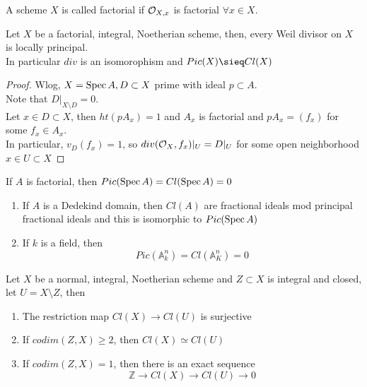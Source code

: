 \documentclass[../main.tex]{subfiles}
\begin{document}
\begin{defn}
	A scheme $X$ is called factorial if $\mathcal{O}_{X,x} $ is factorial $\forall x \in X$.
\end{defn}
\begin{propo}
Let $X$ be a factorial, integral, Noetherian scheme, then, every Weil divisor on $X$ is locally principal.\\
In particular $div$ is an isomorophism and $Pic( X) \sieq Cl( X) $
\end{propo}
\begin{proof}
	Wlog, $X= \operatorname{Spec} A, D \subset X$ prime with ideal $p \subset A$.\\
	Note that $D|_{X\setminus D} = 0$.\\
	Let $x\in D \subset X$, then $ht( p A_x) =1$ and $A_x$ is factorial and $p A_x= ( f_x) $ for some $f_x \in A_x$.\\
	In particular, $v_D( f_x) = 1$, so $ div( \mathcal{O}_X, f_x) |_U = D|_U$ for some open neighborhood $x\in U \subset X$ 
\end{proof}
\begin{crly}
If $A$ is factorial, then $Pic( \operatorname{Spec} A) = Cl ( \operatorname{Spec} A) =0$ 
\end{crly}
\begin{exemple}
\begin{enumerate}
\item If $A$ is a Dedekind domain, then $Cl( A) $ are fractional ideals mod principal fractional ideals and this is isomorphic to $Pic( \operatorname{Spec} A) $ 
\item If $k$ is a field, then
	\[ 
	Pic( \mathbb{A}^{n}_k ) = Cl( \mathbb{A}^{n}_K) =0
	\]
\end{enumerate}
\end{exemple}
\begin{propo}
Let $X$ be a normal, integral, Noetherian scheme and $Z \subset X$ is integral and closed, let $U = X \setminus Z$, then
\begin{enumerate}
\item The restriction map $Cl( X) \to Cl( U) $ is surjective
\item If $codim( Z,X) \geq 2$, then $Cl( X) \simeq Cl( U) $ 
\item If $codim( Z,X) =1$, then there is an exact sequence
	\[ 
	\mathbb{Z}\to Cl( X) \to Cl( U) \to 0
	\]
	
\end{enumerate}

\end{propo}




	
\end{document}

